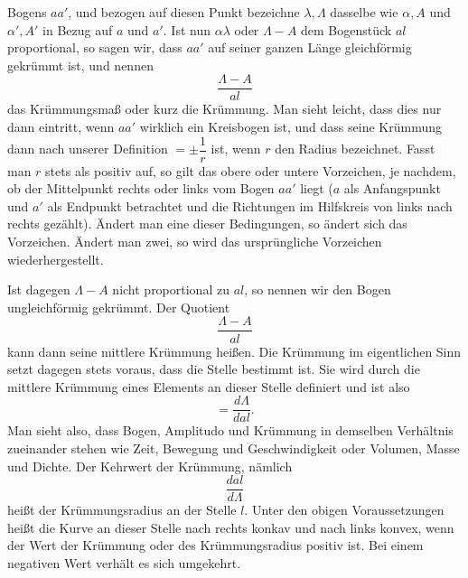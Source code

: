 %
Bogens $aa'$, und bezogen auf diesen Punkt bezeichne $\lambda,\Lambda$ dasselbe wie $\alpha,A$ und $\alpha',A'$ in Bezug auf $a$ und $a'$. Ist nun $\alpha\lambda$ oder $\Lambda-A$ dem Bogenstück $al$ proportional, so sagen wir, dass $aa'$ auf seiner ganzen Länge gleichförmig gekrümmt ist, und nennen
\[
\frac{\Lambda-A}{al}
\]
das Krümmungsmaß oder kurz die Krümmung. Man sieht leicht, dass dies nur dann eintritt, wenn $aa'$ wirklich ein Kreisbogen ist, und dass seine Krümmung dann nach unserer Definition $=\pm\dfrac1r$ ist, wenn $r$ den Radius bezeichnet. Fasst man $r$ stets als positiv auf, so gilt das obere oder untere Vorzeichen, je nachdem, ob der Mittelpunkt rechts oder links vom Bogen $aa'$ liegt ($a$ als Anfangspunkt und $a'$ als Endpunkt betrachtet und die Richtungen im Hilfskreis von links nach rechts gezählt). Ändert man eine dieser Bedingungen, so ändert sich das Vorzeichen. Ändert man zwei, so wird das ursprüngliche Vorzeichen wiederhergestellt.

Ist dagegen $\Lambda-A$ nicht proportional zu $al$, so nennen wir den Bogen ungleichförmig gekrümmt. Der Quotient
\[
\frac{\Lambda-A}{al}
\]
kann dann seine mittlere Krümmung heißen. Die Krümmung im eigentlichen Sinn setzt dagegen stets voraus, dass die Stelle bestimmt ist. Sie wird durch die mittlere Krümmung eines Elements an dieser Stelle definiert und ist also
\[
=\frac{d\Lambda}{dal}.
\]
Man sieht also, dass Bogen, Amplitudo und Krümmung in demselben Verhältnis zueinander stehen wie Zeit, Bewegung und Geschwindigkeit oder Volumen, Masse und Dichte. Der Kehrwert der Krümmung, nämlich
\[
\frac{dal}{d\Lambda}
\]
heißt der Krümmungsradius an der Stelle $l$. Unter den obigen Voraussetzungen heißt die Kurve an dieser Stelle nach rechts konkav und nach links konvex, wenn der Wert der Krümmung oder des Krümmungsradius positiv ist. Bei einem negativen Wert verhält es sich umgekehrt.

